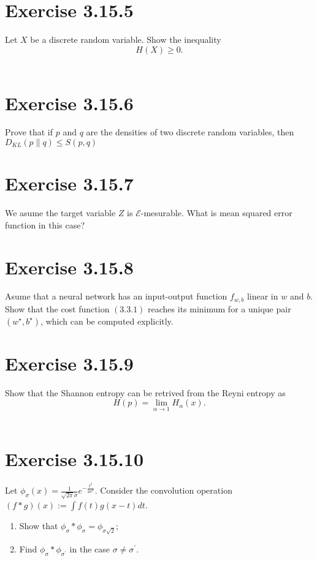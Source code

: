 \documentclass{exam}
\begin{document}
\section*{Exercise 3.15.5}
Let $X$ be a discrete random variable. Show the inequality\\
\begin{equation*}
    H(X) \geq 0.
\end{equation*}\\

\section*{Exercise 3.15.6}
Prove that if $p$ and $q$ are the densities of two discrete random variables, then $D_{KL}(p \lVert q ) \leq S(p,q)$

\section*{Exercise 3.15.7}
We asume the target variable $Z$ is $\mathcal{E}$-mesurable. What is mean squared error function in this case?

\section*{Exercise 3.15.8}
Asume that a neural network has an input-output function $f_{w,b}$ linear in $w$ and $b$. Show that the cost function $(3.3.1)$ reaches its minimum for a 
unique pair $(w^{\star},b^{\star})$, which can be computed explicitly. 

\section*{Exercise 3.15.9}
Show that the Shannon entropy can be retrived from the Reyni entropy as\\
\begin{equation*}
    H(p) = \lim_{\alpha \to 1} H_{\alpha}(x).
\end{equation*}\\

\section*{Exercise 3.15.10}
Let $\phi_\sigma(x) = \displaystyle \frac{1}{\sqrt{2\pi}\sigma}e^{-\frac{t^2}{2\sigma^2}}$. Consider the convolution 
operation $(f \ast g)(x) :=  \displaystyle\int f(t) g(x - t) dt $.
\begin{enumerate}
    \item Show that $\phi_{\sigma} \ast \phi_{\sigma} = \phi_{\sigma\sqrt{2}}$;
    \item Find $\phi_{\sigma} \ast \phi_{\sigma^{\prime}}$ in the case $\sigma \neq \sigma^{\prime}$.
\end{enumerate}
\end{document}
